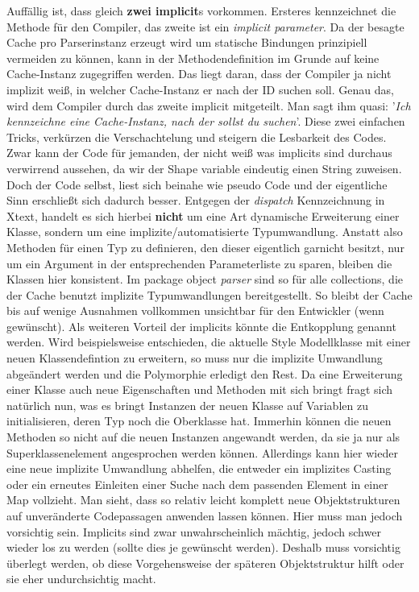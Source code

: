 Auffällig ist, dass gleich \textbf{zwei implicit}s vorkommen. Ersteres kennzeichnet die Methode für den Compiler, das zweite ist ein \textit{implicit parameter}.
Da der besagte Cache pro Parserinstanz erzeugt wird um statische Bindungen prinzipiell vermeiden zu können, kann in der Methodendefinition im Grunde auf keine Cache-Instanz zugegriffen werden.
Das liegt daran, dass der Compiler ja nicht implizit weiß, in welcher Cache-Instanz er nach der ID suchen soll.
Genau das, wird dem Compiler durch das zweite implicit mitgeteilt. Man sagt ihm quasi: '\textit{Ich kennzeichne eine Cache-Instanz, nach der sollst du suchen}'.
Diese zwei einfachen Tricks, verkürzen die Verschachtelung und steigern die Lesbarkeit des Codes.
Zwar kann der Code für jemanden, der nicht weiß was implicits sind durchaus verwirrend aussehen, da wir der Shape variable eindeutig einen String zuweisen.
Doch der Code selbst, liest sich beinahe wie pseudo Code und der eigentliche Sinn erschließt sich dadurch besser.
Entgegen der \textit{dispatch} Kennzeichnung in Xtext, handelt es sich hierbei \textbf{nicht} um eine Art dynamische Erweiterung einer Klasse, sondern um eine implizite/automatisierte Typumwandlung.
Anstatt also Methoden für einen Typ zu definieren, den dieser eigentlich garnicht besitzt, nur um ein Argument in der entsprechenden Parameterliste zu sparen, bleiben die Klassen hier konsistent.
Im package object \textit{parser} sind so für alle collections, die der Cache benutzt implizite Typumwandlungen bereitgestellt.
So bleibt der Cache bis auf wenige Ausnahmen vollkommen unsichtbar für den Entwickler (wenn gewünscht).
Als weiteren Vorteil der implicits könnte die Entkopplung genannt werden.
Wird beispielsweise entschieden, die aktuelle Style Modellklasse mit einer neuen Klassendefintion zu erweitern, so muss nur die implizite Umwandlung abgeändert werden und die Polymorphie erledigt den Rest.
Da eine Erweiterung einer Klasse auch neue Eigenschaften und Methoden mit sich bringt fragt sich natürlich nun, was es bringt Instanzen der neuen Klasse auf Variablen zu initialisieren, deren Typ noch die Oberklasse hat.
Immerhin können die neuen Methoden so nicht auf die neuen Instanzen angewandt werden, da sie ja nur als Superklassenelement angesprochen werden können.
Allerdings kann hier wieder eine neue implizite Umwandlung abhelfen, die entweder ein implizites Casting oder ein erneutes Einleiten einer Suche nach dem passenden Element in einer Map vollzieht.
Man sieht, dass so relativ leicht komplett neue Objektstrukturen auf unveränderte Codepassagen anwenden lassen können.
Hier muss man jedoch vorsichtig sein.
Implicits sind zwar unwahrscheinlich mächtig, jedoch schwer wieder los zu werden (sollte dies je gewünscht werden).
Deshalb muss vorsichtig überlegt werden, ob diese Vorgehensweise der späteren Objektstruktur hilft oder sie eher undurchsichtig macht.
